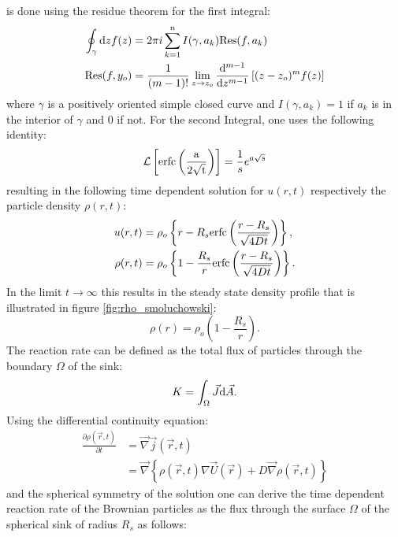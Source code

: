 is done using the residue theorem for the first integral:
\begin{align}
    \oint_{ \gamma } {\rm d}z f(z) &= 2 \pi i \sum_{k = 1}^{n}I(\gamma, a_k) {\rm Res}(f,a_k) \\
    { \rm Res}(f,y_o) &= \frac{1}{(m-1)!} \lim_{z\rightarrow z_o} \frac{{ \rm d} ^{m-1}}{{\rm d} z^{m-1}} \left[ (z - z_o)^{m}f(z) \right]
    \label{residue theorem}
\end{align}
where $\gamma$ is a positively oriented simple closed curve and $I(\gamma,a_k)=1$ if $a_k$ is in the interior of $\gamma$ and $0$ if not. For the second Integral, one uses the following identity:
\begin{equation}
    \mathcal{L}\left[ {\rm erfc\left( \frac{a}{2\sqrt{t}} \right)} \right] = \frac{1}{s}e^{a\sqrt{s}}
    \label{L(erfc)}
\end{equation}
resulting in the following time dependent solution for $u(r,t)$ respectively the particle density $\rho(r,t)$:
\begin{align}
    u(r,t) &= \rho_o \left\{ r - R_s {\rm erfc} \left( \frac{r - R_s}{\sqrt{4 D t}} \right) \right\}, \\
    \rho(r,t) &= \rho_o \left\{ 1 - \frac{R_s}{r}{\rm erfc} \left( \frac{r - R_s}{\sqrt{4Dt}} \right) \right\}.
    \label{u(r,t)}
\end{align}
In the limit $t \rightarrow \infty$ this results in the steady state density profile that is illustrated in figure \ref{fig:rho_smoluchowski}:
\begin{equation}
    \rho(r) =  \rho_o \left( 1 - \frac{R_s}{r} \right).
    \label{steady_state_density}
\end{equation}
The reaction rate can be defined as the total flux of particles through the boundary $\Omega$ of the sink:
\begin{equation}
    K = \int_\Omega \vec{J} {\rm d}\vec{A} .
    \label{reaction rate}
\end{equation}
Using the differential continuity equation:
\begin{align}
    \frac{\partial \rho(\vec{r},t)}{\partial t}&= \vec{\nabla} \vec{j}(\vec{r},t) \nonumber \\
    &= \vec{\nabla} \left\{ \rho(\vec{r},t) \nabla \vec{U}(\vec{r}) + D \vec{\nabla} \rho(\vec{r},t) \right\}
    \label{contiuity_equation}
\end{align}
and the spherical symmetry of the solution one can derive the time dependent reaction rate of the Brownian particles as the flux through the surface $\Omega$ of the spherical sink of radius $R_s$ as follows:

